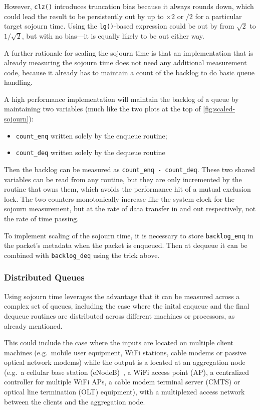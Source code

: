 However, \texttt{clz()} introduces truncation bias because it always rounds down, which could lead the result to be persistently out by up to \(\times2\) or \(/2\) for a particular target sojourn time. Using the \texttt{lg()}-based expression could be out by from \(\sqrt{2}\) to \(1/\sqrt{2}\), but with no bias---it is equally likely to be out either way.

A further rationale for scaling the sojourn time is that an implementation that is already measuring the sojourn time does not need any additional measurement code, because it already has to maintain a count of the backlog to do basic queue handling.

A high performance implementation will maintain the backlog of a queue by maintaining two variables (much like the two plots at the top of \autoref{fig:scaled-sojourn}):
\begin{itemize}[nosep]
	\item[] \texttt{count\_enq} written solely by the enqueue routine;
	\item[] \texttt{count\_deq} written solely by the dequeue routine
\end{itemize}	
Then the backlog can be measured as \texttt{count\_enq - count\_deq}. These two shared variables can be read from any routine, but they are only incremented by the routine that owns them, which avoids the performance hit of a mutual exclusion lock. The two counters monotonically increase like the system clock for the sojourn measurement, but at the rate of data transfer in and out respectively, not the rate of time passing. 

To implement scaling of the sojourn time, it is necessary to store \texttt{backlog\_enq} in the packet's metadata when the packet is enqueued. Then at dequeue it can be combined with \texttt{backlog\_deq} using the trick above.

\subsubsection{Distributed Queues}\label{sec:sojourn-distrib}

Using sojourn time leverages the advantage that it can be measured across a complex set of queues, including the case where the inital enqueue and the final dequeue routines are distributed across different machines or processors, as already mentioned.

This could include the case where the inputs are located on multiple client machines (e.g.\ mobile user equipment, WiFi stations, cable modems or passive optical network modems) while the output is a located at an aggregation node (e.g.\ a cellular base station (eNodeB)~\cite{Tan09:AQM_uplink_patent}, a WiFi access point (AP), a centralized controller for multiple WiFi APs, a cable modem terminal server (CMTS) or optical line termination (OLT) equipment), with a multiplexed access network between the clients and the aggregation node.

